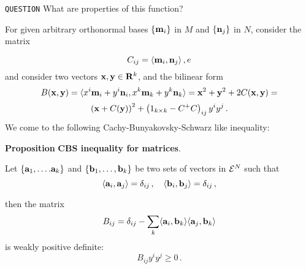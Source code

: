  {\tt QUESTION}  What are properties of this function?

\medskip


   For given arbitrary orthonormal bases
  $\{{\bf m}_i\}$ in $M$ and
  $\{{\bf n}_j\}$ in $N$, consider the matrix

                 $$
        C_{ij}=\langle
          {\bf m}_i,{\bf n}_j\rangle\,,e
                 $$
and
consider two vectors ${\bf x},{\bf y}\in {\bf R}^k$, 
and the bilinear form
             $$
     B({\bf x},{\bf y})=\langle 
       x^i{\bf m}_i+y^i{\bf n}_i,
       x^k{\bf m}_k+y^k{\bf n}_k
            \rangle=
{\bf x}^2+{\bf y}^2+2C({\bf x},{\bf y})=
                $$
                $$
\left({\bf x}+C({\bf y})\right)^2+
\left(
 1_{k\times k}-C^+C
\right)_{ij}y^iy^j\,.
             $$   
We come to  the following Cachy-Bunyakovsky-Schwarz like inequality:
 

{\bf Proposition} {\bf CBS inequality for matrices}.

Let  $\{{\bf a}_1,\dots.{\bf a}_k\}$
and  $\{{\bf b}_1,\dots,{\bf b}_k\}$ 
be two sets of vectors in ${\cal E}^N$ such that
         $$
\langle{\bf a}_i,{\bf a}_j\rangle=\delta_{ij}\,,\quad
\langle{\bf b}_i,{\bf b}_j\rangle=\delta_{ij}\,,
         $$ 
 
then the matrix 
             $$
   B_{ij}=\delta_{ij}-\sum_k 
 \langle {\bf a}_i,{\bf b}_k\rangle
 \langle {\bf a}_j,{\bf b}_k\rangle
             $$
is weakly positive definite:
             $$
       B_{ij}y^iy^j\geq 0\,.
             $$
 
\bye 


